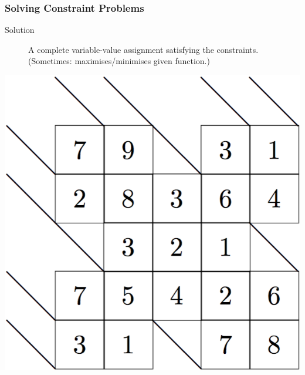 \documentclass{beamer}
\begin{document}
\begin{frame}
  \frametitle{Solving Constraint Problems}
  \begin{minipage}{0.6\textwidth}
    \begin{description}
    \item[Solution]
      A complete
      variable-value assignment satisfying the constraints.\\
      \smallskip
      (Sometimes: maximises/minimises given function.)
    \end{description}
  \end{minipage}
  \begin{minipage}{0.35\textwidth}
    \includegraphics[scale=0.15]{kakuro-sol.png} \\
  \end{minipage}
  

\end{frame}
\end{document}
